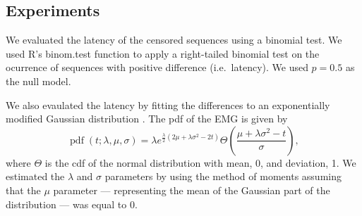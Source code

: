 \documentclass[12pt]{article}
\begin{document}
\subsection * {Experiments} \label{subsec:experiments}

%
%
%


We evaluated the latency of the censored sequences using a {binomial test}.
We used R's binom.test function to apply a right-tailed binomial test on the ocurrence of sequences with positive difference (i.e.~latency). We used $p=0.5$ as the null model.

We also evaulated the latency by fitting the differences to an exponentially modified Gaussian distribution \citep[EMG;][]{Golubev10}. The pdf of the EMG is given by
\[\operatorname{pdf}(t; \lambda, \mu, \sigma) = \lambda e^{\frac{\lambda}{2}(2\mu+\lambda\sigma^2-2t)}\Theta\left(\frac{\mu + \lambda\sigma^2 - t}{\sigma}\right),\]
where $\Theta$ is the cdf of the normal distribution with mean, 0, and deviation, 1. We estimated the $\lambda$ and $\sigma$ parameters by using the method of moments assuming that the $\mu$ parameter --- representing the mean of the Gaussian part of the distribution --- was equal to 0.
\end{document}
